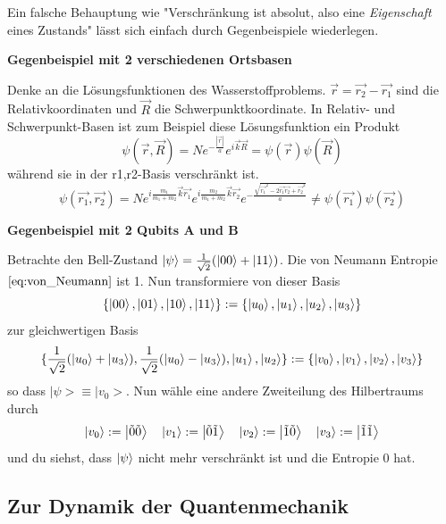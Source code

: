 \documentclass[12pt]{book}
\begin{document}
Ein falsche Behauptung wie "Verschränkung ist absolut, also eine \emph{Eigenschaft} eines Zustands" lässt sich einfach durch Gegenbeispiele wiederlegen. 

\textbf{Gegenbeispiel mit 2 verschiedenen Ortsbasen}

Denke an die Lösungsfunktionen des Wasserstoffproblems. $\vec{r}=\vec{r_2}-\vec{r_1}$ sind die Relativkoordinaten und $\vec{R}$ die Schwerpunktkoordinate. In Relativ- und Schwerpunkt-Basen ist zum Beispiel diese Lösungsfunktion ein Produkt
\begin{equation*}
\psi(\vec{r},\vec{R}) = N e^{ -\frac{|\vec{r}|}{a} } e^{ i \vec{k}\vec{R} } = \psi(\vec{r})\psi(\vec{R})
\end{equation*}
während sie in der r1,r2-Basis verschränkt ist.
\begin{equation*}
\psi(\vec{r_1},\vec{r_2}) = N e^{ i \frac{m_1}{m_1+m_2} \vec{k}\vec{r_1} }  e^{ i \frac{m_2}{m_1+m_2} \vec{k}\vec{r_2} }  e^{-\frac{ \sqrt{ \vec{r_1}^2 - 2\vec{r_1}\vec{r_2} + \vec{r_2}^2 } }{a}} \neq \psi(\vec{r_1})\psi(\vec{r_2})
\end{equation*}

\textbf{Gegenbeispiel mit 2 Qubits A und B}

Betrachte den Bell-Zustand $\ket{\psi} = \frac{1}{\sqrt{2}}(\ket{00}+\ket{11})$. 
Die von Neumann Entropie $\ref{eq:von_Neumann}$ ist 1. Nun transformiere von dieser Basis
\begin{equation*}
\{\ket{00},\ket{01},\ket{10},\ket{11}\} := \{\ket{u_0},\ket{u_1},\ket{u_2},\ket{u_3}\}
\end{equation*}
zur gleichwertigen Basis
\begin{equation*}
\{ \frac{1}{\sqrt{2}}(\ket{u_0}+\ket{u_3}),\frac{1}{\sqrt{2}}(\ket{u_0}-\ket{u_3}),\ket{u_1},\ket{u_2} \} := \{\ket{v_0},\ket{v_1},\ket{v_2},\ket{v_3}\}
\end{equation*}
so dass $|\psi> \equiv |v_0>$. Nun wähle eine andere Zweiteilung des Hilbertraums durch 
\begin{equation*}
\ket{v_0} := \ket{\tilde{0}\tilde{0}} \quad 
\ket{v_1} := \ket{\tilde{0}\tilde{1}} \quad
\ket{v_2} := \ket{\tilde{1}\tilde{0}} \quad
\ket{v_3} := \ket{\tilde{1}\tilde{1}}
\end{equation*}
und du siehst, dass $\ket{\psi}$ nicht mehr verschränkt ist und die Entropie 0 hat.

\subsection{Zur Dynamik der Quantenmechanik}
\end{document}
